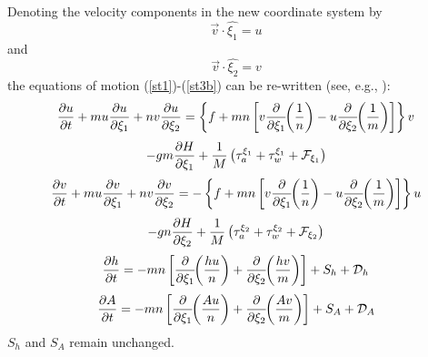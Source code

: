 Denoting the velocity components in the new coordinate system by
\begin{equation}
   \vec{v} \cdot \hat{\xi_1} = u
\end{equation}
and
\begin{equation}
   \vec{v} \cdot \hat{\xi_2} = v
\end{equation}
the equations of motion (\ref{st1})-(\ref{st3b}) can be re-written
(see, e.g., \cite{AL}):
{\samepage
\[
   {\partial u \over \partial t} +
   m u {\partial u \over \partial \xi_1} +
   n v {\partial u \over \partial \xi_2} =
   \left\{f + mn \left[ v \frac{\partial}{\partial \xi_1}
   \!\! \left( \frac{1}{n} \right) - u \frac{\partial}{\partial \xi_2}
   \!\! \left( \frac{1}{m} \right) \right] \right\} v
\]
\begin{equation}
   - gm {\partial H \over \partial \xi_1} +
   {1 \over M} \left( \tau_a^{\xi_1} + \tau_w^{\xi_1} + {\cal F}_{\xi_1}
   \right)
\label{st13}
\end{equation}
}
\vspace{.2cm}
{\samepage
\[
   {\partial v \over \partial t} +
   m u {\partial v \over \partial \xi_1} +
   n v {\partial v \over \partial \xi_2} =
   - \left\{f + mn \left[ v \frac{\partial}{\partial \xi_1}
   \!\! \left( \frac{1}{n} \right) - u \frac{\partial}{\partial \xi_2}
   \!\! \left( \frac{1}{m} \right) \right] \right\} u
\]
\begin{equation}
   - gn {\partial H \over \partial \xi_2} +
   {1 \over M} \left( \tau_a^{\xi_2} + \tau_w^{\xi_2} + {\cal F}_{\xi_2}
   \right)
\label{st14}
\end{equation}
}
\vspace{.2cm}
\begin{equation}
   {\partial h \over \partial t} =
   - mn \left[ {\partial \over \partial \xi_1} \!\! \left( {hu \over n}
   \right ) + {\partial \over \partial \xi_2} \!\! \left( {hv \over m}
   \right) \right] + S_h + {\cal D}_h
\label{st15}
\end{equation}
\vspace{.2cm}
\begin{equation}
   {\partial A \over \partial t} =
   - mn \left[ {\partial \over \partial \xi_1} \!\! \left( {Au \over n}
   \right ) + {\partial \over \partial \xi_2} \!\! \left( {Av \over m}
   \right) \right] + S_A + {\cal D}_A
\label{st16}
\end{equation}
\vspace{.2cm}
$S_h$ and $S_A$ remain unchanged.

